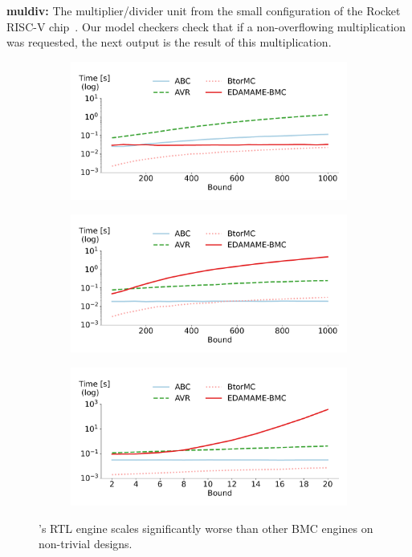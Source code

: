 \documentclass[acmsmall,screen,review]{acmart}
\begin{document}
\textbf{muldiv:} The multiplier/divider unit from the small configuration of the
Rocket RISC-V chip~\cite{ucb2016rocket}. Our model checkers check that if a non-overflowing multiplication was requested, the next output is the result of this multiplication.

\begin{figure}
\centering
\begin{subfigure}{0.32\columnwidth}
\includegraphics[width=\columnwidth]{bmc-plots/mitre.pdf}
\label{fig:benchmark-lin-s}
\end{subfigure}
\hfill
\begin{subfigure}{0.32\columnwidth}
\includegraphics[width=\columnwidth]{bmc-plots/fsm.pdf}
\label{fig:benchmark-lin-l}
\end{subfigure}
\hfill
\begin{subfigure}{0.32\columnwidth}
\includegraphics[width=\columnwidth]{bmc-plots/MulDiv.pdf}
\label{fig:benchmark-err-s}
\end{subfigure}
\caption{\toolname{}'s RTL engine scales significantly worse than other BMC engines on non-trivial designs.}\label{fig:benchmark-bmc}
\end{figure}  
\end{document}
